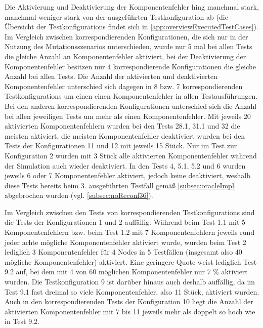 Die Aktivierung und Deaktivierung der Komponentenfehler hing manchmal stark, manchmal weniger stark von der ausgeführten \gls{Testkonfiguration} ab (die Übersicht der \glspl{Testkonfiguration} findet sich in \cref{app:overviewExecutedTestCases}).
Im Vergleich zwischen korrespondierenden Konfigurationen, die sich nur in der Nutzung des Mutationsszenarios unterschieden, wurde nur 5 mal bei allen \glspl{Test} die gleiche Anzahl an Komponentenfehler aktiviert, bei der Deaktivierung der Komponentenfehler besitzen nur 4 korrespondierende Konfigurationen die gleiche Anzahl bei allen Tests.
Die Anzahl der aktivierten und deaktivierten Komponentenfehler unterschied sich dagegen in 8 bzw. 7 korrespondierenden \glspl{Testkonfiguration} um einen einen Komponentenfehler in allen Testausführungen.
Bei den anderen korrespondierenden Konfigurationen unterschied sich die Anzahl bei allen jeweiligen \glspl{Test} um mehr als einen Komponentenfehler.
Mit jeweils 20 aktivierten Komponentenfehlern wurden bei den \glspl{Test} 28.1, 31.1 und 32 die meisten aktiviert, die meisten Komponentenfehler deaktiviert wurden bei den \glspl{Test} der Konfigurationen 11 und 12 mit jeweils 15 Stück.
Nur im \gls{Test} zur Konfiguration 2 wurden mit 3 Stück alle aktivierten Komponentenfehler während der Simulation auch wieder deaktiviert.
In den \glspl{Test} 4, 5.1, 5.2 und 6 wurden jeweils 6 oder 7 Komponentenfehler aktiviert, jedoch keine deaktiviert, weshalb diese \glspl{Test} bereits beim 3. ausgeführten \gls{Testfall} gemäß \cref{subsec:oracleImpl} abgebrochen wurden (vgl. \cref{subsec:noReconf36}).

Im Vergleich zwischen den \glspl{Test} von korrespondierenden \glspl{Testkonfiguration} sind die \glspl{Test} der Konfigurationen 1 und 2 auffällig.
Während beim \gls{Test} 1.1 mit 5 Komponentenfehlern bzw. beim \gls{Test} 1.2 mit 7 Komponentenfehlern jeweils rund jeder achte mögliche Komponentenfehler aktiviert wurde, wurden beim \gls{Test} 2 lediglich 3 Komponentenfehler für 4 Nodes in 5 Testfällen (insgesamt also 40 mögliche Komponentenfehler) aktiviert.
Eine geringere Quote weist lediglich \gls{Test} 9.2 auf, bei dem mit 4 von 60 möglichen Komponentenfehler nur 7 \% aktiviert wurden.
Die \gls{Testkonfiguration} 9 ist darüber hinaus auch deshalb auffällig, da im \gls{Test} 9.1 fast dreimal so viele Komponentenfehler, also 11 Stück, aktiviert wurden.
Auch in den korrespondierenden \glspl{Test} der Konfiguration 10 liegt die Anzahl der aktivierten Komponentenfehler mit 7 bis 11 jeweils mehr als doppelt so hoch wie in \gls{Test} 9.2.

